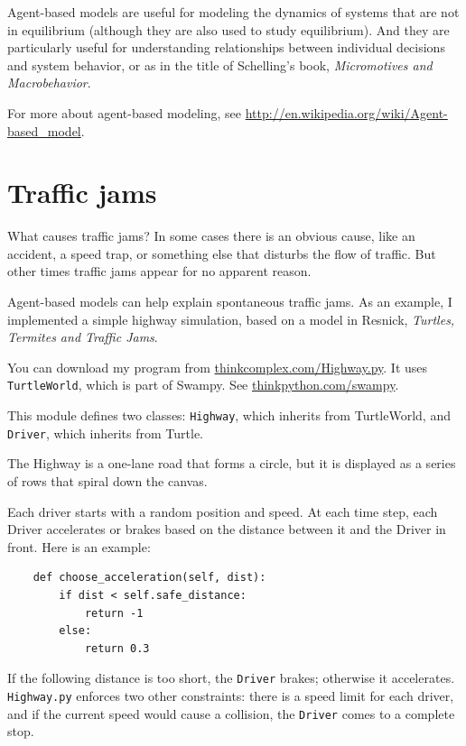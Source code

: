 \documentclass[10pt]{book}
\begin{document}
Agent-based models are useful for modeling the dynamics of systems
that are not in equilibrium (although they are also used to study
equilibrium).  And they are particularly useful for understanding
relationships between individual decisions and system behavior, or as
in the title of Schelling's book, {\em Micromotives and Macrobehavior}.

For more about agent-based modeling, see
\url{http://en.wikipedia.org/wiki/Agent-based_model}.


\section{Traffic jams}

What causes traffic jams?  In some cases there is an obvious cause,
like an accident, a speed trap, or something else that disturbs
the flow of traffic.  But other times traffic jams appear for no
apparent reason.

Agent-based models can help explain spontaneous traffic jams.
As an example, I implemented a simple highway simulation, based on
a model in Resnick, {\em Turtles, Termites and Traffic Jams}.

You can download my program from \url{thinkcomplex.com/Highway.py}.
It uses {\tt TurtleWorld}, which is part of Swampy.
See \url{thinkpython.com/swampy}.

This module defines two classes: {\tt Highway}, which inherits from
TurtleWorld, and {\tt Driver}, which inherits from Turtle.

The Highway is a one-lane road that forms a circle, but it is displayed
as a series of rows that spiral down the canvas.

Each driver starts with a random position and speed.  At each time
step, each Driver accelerates or brakes based on the distance between
it and the Driver in front.  Here is an example:

\begin{verbatim}
    def choose_acceleration(self, dist):
        if dist < self.safe_distance:
            return -1
        else:
            return 0.3
\end{verbatim}

If the following distance is too short, the {\tt Driver} brakes;
otherwise it accelerates.  {\tt Highway.py} enforces two other
constraints: there is a speed limit for each driver, and if the
current speed would cause a collision, the {\tt Driver} comes to a
complete stop.
\end{document}
